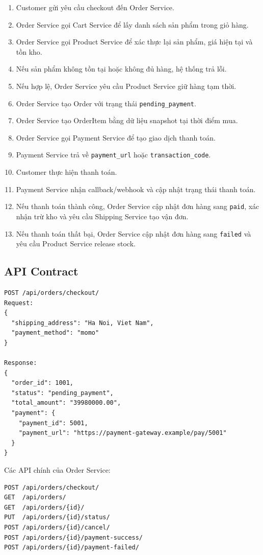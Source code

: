 \begin{enumerate}
  \item Customer gửi yêu cầu checkout đến Order Service.
  \item Order Service gọi Cart Service để lấy danh sách sản phẩm trong giỏ hàng.
  \item Order Service gọi Product Service để xác thực lại sản phẩm, giá hiện tại và tồn kho.
  \item Nếu sản phẩm không tồn tại hoặc không đủ hàng, hệ thống trả lỗi.
  \item Nếu hợp lệ, Order Service yêu cầu Product Service giữ hàng tạm thời.
  \item Order Service tạo Order với trạng thái \texttt{pending\_payment}.
  \item Order Service tạo OrderItem bằng dữ liệu snapshot tại thời điểm mua.
  \item Order Service gọi Payment Service để tạo giao dịch thanh toán.
  \item Payment Service trả về \texttt{payment\_url} hoặc \texttt{transaction\_code}.
  \item Customer thực hiện thanh toán.
  \item Payment Service nhận callback/webhook và cập nhật trạng thái thanh toán.
  \item Nếu thanh toán thành công, Order Service cập nhật đơn hàng sang \texttt{paid}, xác nhận trừ kho và yêu cầu Shipping Service tạo vận đơn.
  \item Nếu thanh toán thất bại, Order Service cập nhật đơn hàng sang \texttt{failed} và yêu cầu Product Service release stock.
\end{enumerate}

\subsection{API Contract}

\begin{lstlisting}[style=code]
POST /api/orders/checkout/
Request:
{
  "shipping_address": "Ha Noi, Viet Nam",
  "payment_method": "momo"
}

Response:
{
  "order_id": 1001,
  "status": "pending_payment",
  "total_amount": "39980000.00",
  "payment": {
    "payment_id": 5001,
    "payment_url": "https://payment-gateway.example/pay/5001"
  }
}
\end{lstlisting}

Các API chính của Order Service:

\begin{lstlisting}[style=code]
POST /api/orders/checkout/
GET  /api/orders/
GET  /api/orders/{id}/
PUT  /api/orders/{id}/status/
POST /api/orders/{id}/cancel/
POST /api/orders/{id}/payment-success/
POST /api/orders/{id}/payment-failed/
\end{lstlisting}

